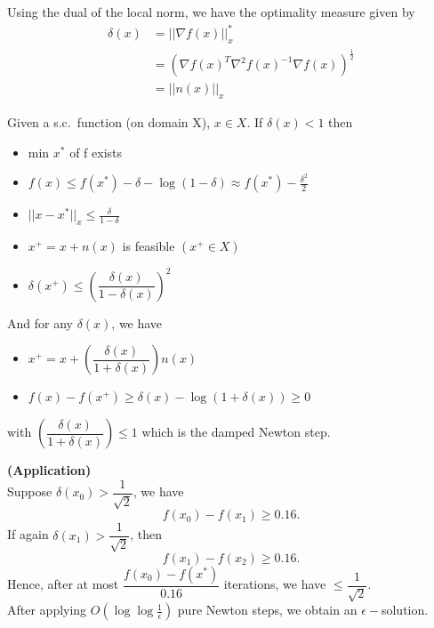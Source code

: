 Using the dual of the local norm, we have the optimality measure given by
\begin{align*}
\delta(x) &= ||\nabla f(x)||^*_x \\
& = (\nabla f(x)^T \nabla^2f(x)^{-1}\nabla f(x))^{\frac{1}{2}} \\
&= ||n(x)||_x
\end{align*}

\begin{property}
Given a s.c.\ function (on domain X), $x\in X$. If $\delta(x) < 1$ then 
\begin{itemize}
\item min $x^*$ of f exists
\item $f(x) \leq f(x^*) - \delta - \log{(1-\delta)} \approx f(x^*) - \frac{\delta^2}{2}$
\item $||x-x^*||_x \leq \frac{\delta}{1 - \delta} $
\item $x^+ = x + n(x)$ is feasible $(x^+ \in X)$
\item $\delta(x^+) \leq \left(\dfrac{\delta(x)}{1-\delta(x)}\right)^2 $\\
\end{itemize}
And for any $\delta(x)$, we have 
\begin{itemize}
\item $x^+ = x + \left(\dfrac{\delta(x)}{1+\delta(x)}\right)n(x) $
\item $f(x) - f(x^+) \geq \delta(x) - \log{(1+\delta(x))} \geq 0 $
\end{itemize}
with $\left(\dfrac{\delta(x)}{1+\delta(x)}\right) \le 1$ which is the damped Newton step.
\end{property}

\begin{example}
\begin{leftbar}
\textbf{(Application)}\\ 
Suppose $\delta(x_0) > \dfrac{1}{\sqrt{2}}$, we have $$f(x_0) - f(x_1) \geq 0.16.$$ 
If again $\delta(x_1) > \dfrac{1}{\sqrt{2}}$, then $$f(x_1) - f(x_2) \geq 0.16.$$ Hence, after at most $\dfrac{f(x_0) - f(x^*)}{0.16}$ iterations, we have $\leq \dfrac{1}{\sqrt{2}}$. \\
After applying $O(\log{\log{\frac{1}{\epsilon}}})$ pure Newton steps, we obtain an $\epsilon-$solution.
\end{leftbar}
\end{example}

%
